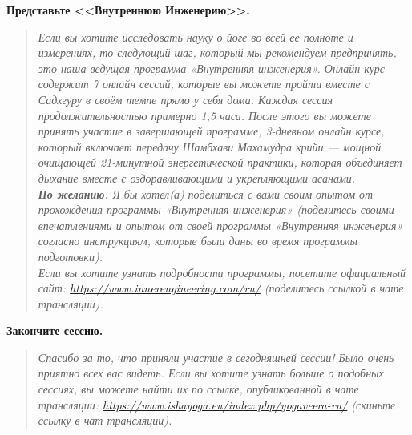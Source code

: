 \textbf{Представьте <<Внутреннюю Инженерию>>.}
\begin{quote}\emph{%
\noindent%
Если вы хотите исследовать науку о йоге во всей ее полноте и измерениях,
то следующий шаг, который мы рекомендуем предпринять, это наша
ведущая программа «Внутренняя инженерия». Онлайн-курс содержит 7
онлайн сессий, которые вы можете пройти вместе с Садхгуру в своём
темпе прямо у себя дома. Каждая сессия продолжительностью примерно
1,5 часа. После этого вы можете принять участие в завершающей
программе, 3-дневном онлайн курсе, который включает передачу
Шамбхави Махамудра крийи — мощной очищающей 21-минутной
энергетической практики, которая объединяет дыхание вместе с
оздоравливающими и укрепляющими асанами.
\\[3pt]
\textbf{По желанию.} Я бы хотел(а) поделиться с вами своим опытом от прохождения программы «Внутренняя инженерия» {\color{CadetBlue}(поделитесь своими впечатлениями и опытом от своей программы «Внутренняя инженерия» согласно инструкциям, которые были даны во время программы подготовки)}.
\\[3pt]
Если вы хотите узнать подробности программы, посетите официальный
сайт: \href{http://www.innerengineering.com}{\small https://www.innerengineering.com/ru/} {\color{CadetBlue}(поделитесь ссылкой в чате трансляции)}.
}\end{quote}
\textbf{Закончите сессию.}
\begin{quote}\emph{%
\noindent%
Спасибо за то, что приняли участие в сегодняшней сессии! Было очень приятно всех вас видеть. Если вы хотите узнать больше о подобных сессиях, вы можете найти их по ссылке, опубликованной в чате трансляции: \href{https://www.ishayoga.eu/index.php/yogaveera-ru/}{\small https://www.ishayoga.eu/index.php/yogaveera-ru/} {\color{CadetBlue}(скиньте ссылку в чат трансляции)}. 
}\end{quote}

